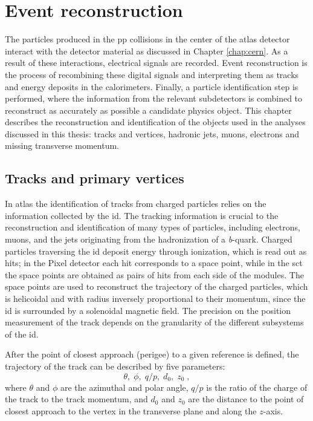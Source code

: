 \chapter{Event reconstruction}
\label{sec:event:reco}

The particles produced in the \gls{pp} collisions in the center of the \gls{atlas} detector interact with the detector material as discussed in Chapter \ref{chap:cern}. As a result of these interactions, electrical signals are recorded. Event reconstruction is the process of recombining these digital signals and interpreting them as tracks and energy deposits in the calorimeters. Finally, a particle identification step
is performed, where the information from the relevant subdetectors is combined to reconstruct as accurately
as possible a candidate physics object.
This chapter describes the reconstruction and identification of the objects used in the analyses discussed in this thesis: tracks and vertices, hadronic jets, muons, electrons and missing transverse momentum. 


\section{Tracks and primary vertices}
\label{sec:reco:tracks}

In \gls{atlas} the identification of tracks from charged particles relies on the information collected by the \gls{id}. The tracking information is crucial to the reconstruction and identification of many types of particles, including electrons, muons, and the jets originating from the hadronization of a \textit{b}-quark. 
Charged particles traversing the \gls{id} deposit energy through ionization,  
which is read out as hits; in the Pixel detector each hit corresponds to a space point, 
while in the \gls{sct} the space points are obtained as pairs of hits from each side of the modules. 
The space points are used to reconstruct the trajectory of the charged particles, which 
is helicoidal and with radius inversely 
proportional to their momentum, 
since the \gls{id} is surrounded by a solenoidal magnetic field.
The precision on the position measurement of the track depends on the granularity of the different subsystems of the \gls{id}.


After the point of closest approach (perigee) to a given reference is defined, the trajectory of the track can be described by five parameters: 
\begin{equation}
\theta, \; \phi, \; q/p, \; d_0, \; z_0 \;, \nonumber
\end{equation}
\noindent where $\theta$ and $\phi$ are the azimuthal and polar angle, $q/p$ is the ratio of the charge of the track to the track momentum, and $d_0$ and $z_0$ are the distance to the point of closest approach to the vertex in the transverse plane and along the $z$-axis. 


